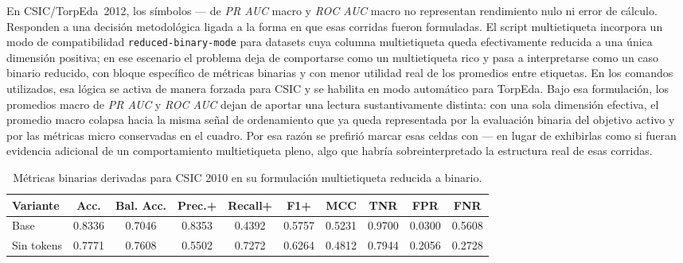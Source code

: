 \documentclass[12pt,oneside]{report}
\begin{document}
En CSIC/TorpEda~2012, los símbolos --- de \textit{PR AUC} macro y \textit{ROC AUC} macro no representan rendimiento nulo ni error de cálculo. Responden a una decisión metodológica ligada a la forma en que esas corridas fueron formuladas. El script multietiqueta incorpora un modo de compatibilidad \texttt{reduced-binary-mode} para datasets cuya columna multietiqueta queda efectivamente reducida a una única dimensión positiva; en ese escenario el problema deja de comportarse como un multietiqueta rico y pasa a interpretarse como un caso binario reducido, con bloque específico de métricas binarias y con menor utilidad real de los promedios entre etiquetas. En los comandos utilizados, esa lógica se activa de manera forzada para CSIC y se habilita en modo automático para TorpEda. Bajo esa formulación, los promedios macro de \textit{PR AUC} y \textit{ROC AUC} dejan de aportar una lectura sustantivamente distinta: con una sola dimensión efectiva, el promedio macro colapsa hacia la misma señal de ordenamiento que ya queda representada por la evaluación binaria del objetivo activo y por las métricas micro conservadas en el cuadro. Por esa razón se prefirió marcar esas celdas con --- en lugar de exhibirlas como si fueran evidencia adicional de un comportamiento multietiqueta pleno, algo que habría sobreinterpretado la estructura real de esas corridas.

\begin{table}[H]
\centering
\caption{Métricas binarias derivadas para CSIC 2010 en su formulación multietiqueta reducida a binario.}
\label{tab:res-ml-csic-bin}
\scriptsize
\renewcommand{\arraystretch}{1.12}
\begin{adjustbox}{max width=\textwidth}
\begin{tabular}{lccccccccc}
\toprule
\textbf{Variante} & \textbf{Acc.} & \textbf{Bal. Acc.} & \textbf{Prec.+} & \textbf{Recall+} & \textbf{F1+} & \textbf{MCC} & \textbf{TNR} & \textbf{FPR} & \textbf{FNR} \\
\midrule
Base & 0.8336 & 0.7046 & 0.8353 & 0.4392 & 0.5757 & 0.5231 & 0.9700 & 0.0300 & 0.5608 \\Sin tokens & 0.7771 & 0.7608 & 0.5502 & 0.7272 & 0.6264 & 0.4812 & 0.7944 & 0.2056 & 0.2728 \\\bottomrule
\end{tabular}
\end{adjustbox}
\end{table}
\end{document}
